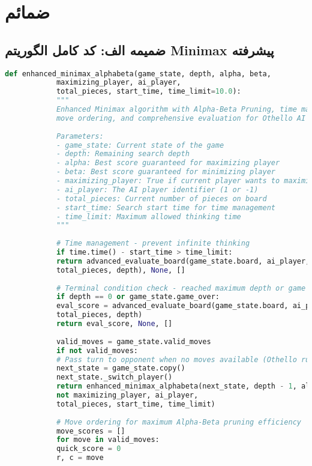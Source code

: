 \documentclass[12pt]{article}
\newenvironment{ltrcode}{\lr\bgroup}{\egroup}
\begin{document}
	
	\section{ضمائم}
	
	\subsection{ضمیمه الف: کد کامل الگوریتم Minimax پیشرفته}
	
	\begin{ltrcode}
		\begin{lstlisting}[language=Python, caption=Complete Enhanced Minimax with Alpha-Beta Pruning]
			def enhanced_minimax_alphabeta(game_state, depth, alpha, beta, 
			maximizing_player, ai_player, 
			total_pieces, start_time, time_limit=10.0):
			"""
			Enhanced Minimax algorithm with Alpha-Beta Pruning, time management,
			move ordering, and comprehensive evaluation for Othello AI
			
			Parameters:
			- game_state: Current state of the game
			- depth: Remaining search depth  
			- alpha: Best score guaranteed for maximizing player
			- beta: Best score guaranteed for minimizing player
			- maximizing_player: True if current player wants to maximize score
			- ai_player: The AI player identifier (1 or -1)
			- total_pieces: Current number of pieces on board
			- start_time: Search start time for time management
			- time_limit: Maximum allowed thinking time
			"""
			
			# Time management - prevent infinite thinking
			if time.time() - start_time > time_limit:
			return advanced_evaluate_board(game_state.board, ai_player, 
			total_pieces, depth), None, []
			
			# Terminal condition check - reached maximum depth or game ended
			if depth == 0 or game_state.game_over:
			eval_score = advanced_evaluate_board(game_state.board, ai_player, 
			total_pieces, depth)
			return eval_score, None, []
			
			valid_moves = game_state.valid_moves
			if not valid_moves:
			# Pass turn to opponent when no moves available (Othello rules)
			next_state = game_state.copy()
			next_state._switch_player()
			return enhanced_minimax_alphabeta(next_state, depth - 1, alpha, beta, 
			not maximizing_player, ai_player, 
			total_pieces, start_time, time_limit)
			
			# Move ordering for maximum Alpha-Beta pruning efficiency
			move_scores = []
			for move in valid_moves:
			quick_score = 0
			r, c = move
			

\end{lstlisting}
\end{ltrcode}
\end{document}
